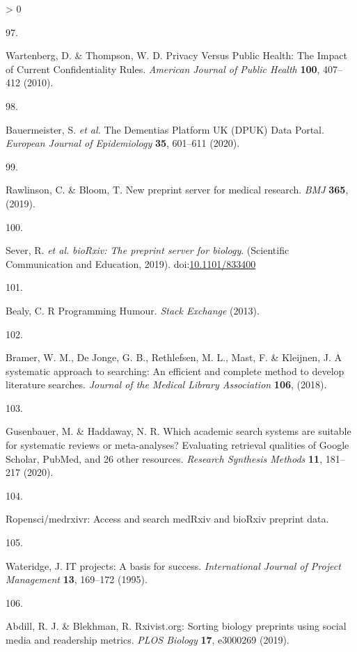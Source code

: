 \documentclass[a4paper, twoside]{templates/ociamthesis}
\newlength{\cslhangindent}
\newlength{\csllabelwidth}
\newenvironment{CSLReferences}[3] %
 {%
  \setlength{\parindent}{0pt}
  \ifodd #1 \everypar{\setlength{\hangindent}{\cslhangindent}}\ignorespaces\fi
  \ifnum #2 > 0
  \setlength{\parskip}{#2\baselineskip}
  \fi
 }%
 {}
\newcommand{\CSLLeftMargin}[1]{\parbox[t]{\maxof{\widthof{#1}}{\csllabelwidth}}{#1}}
\newcommand{\CSLRightInline}[1]{\parbox[t]{\linewidth - \csllabelwidth}{#1}}
\begin{document}
\begin{CSLReferences}{0}{0}
\leavevmode\hypertarget{ref-wartenberg2010}{}%
\CSLLeftMargin{97. }
\CSLRightInline{Wartenberg, D. \& Thompson, W. D. Privacy {Versus Public Health}: {The Impact} of {Current Confidentiality Rules}. \emph{American Journal of Public Health} \textbf{100}, 407--412 (2010).}

\leavevmode\hypertarget{ref-bauermeister2020}{}%
\CSLLeftMargin{98. }
\CSLRightInline{Bauermeister, S. \emph{et al.} The {Dementias Platform UK} ({DPUK}) {Data Portal}. \emph{European Journal of Epidemiology} \textbf{35}, 601--611 (2020).}

\leavevmode\hypertarget{ref-rawlinson2019}{}%
\CSLLeftMargin{99. }
\CSLRightInline{Rawlinson, C. \& Bloom, T. New preprint server for medical research. \emph{BMJ} \textbf{365}, (2019).}

\leavevmode\hypertarget{ref-sever2019}{}%
\CSLLeftMargin{100. }
\CSLRightInline{Sever, R. \emph{et al.} \emph{{bioRxiv}: The preprint server for biology}. ({Scientific Communication and Education}, 2019). doi:\href{https://doi.org/10.1101/833400}{10.1101/833400}}

\leavevmode\hypertarget{ref-bealy2013}{}%
\CSLLeftMargin{101. }
\CSLRightInline{Bealy, C. R {Programming Humour}. \emph{Stack Exchange} (2013).}

\leavevmode\hypertarget{ref-bramer2018a}{}%
\CSLLeftMargin{102. }
\CSLRightInline{Bramer, W. M., De Jonge, G. B., Rethlefsen, M. L., Mast, F. \& Kleijnen, J. A systematic approach to searching: An efficient and complete method to develop literature searches. \emph{Journal of the Medical Library Association} \textbf{106}, (2018).}

\leavevmode\hypertarget{ref-gusenbauer2020}{}%
\CSLLeftMargin{103. }
\CSLRightInline{Gusenbauer, M. \& Haddaway, N. R. Which academic search systems are suitable for systematic reviews or meta-analyses? {Evaluating} retrieval qualities of {Google Scholar}, {PubMed}, and 26 other resources. \emph{Research Synthesis Methods} \textbf{11}, 181--217 (2020).}

\leavevmode\hypertarget{ref-zotero-15029}{}%
\CSLLeftMargin{104. }
\CSLRightInline{Ropensci/medrxivr: {Access} and search {medRxiv} and {bioRxiv} preprint data.}

\leavevmode\hypertarget{ref-wateridge1995}{}%
\CSLLeftMargin{105. }
\CSLRightInline{Wateridge, J. {IT} projects: A basis for success. \emph{International Journal of Project Management} \textbf{13}, 169--172 (1995).}

\leavevmode\hypertarget{ref-abdill2019}{}%
\CSLLeftMargin{106. }
\CSLRightInline{Abdill, R. J. \& Blekhman, R. Rxivist.org: {Sorting} biology preprints using social media and readership metrics. \emph{PLOS Biology} \textbf{17}, e3000269 (2019).}


\end{CSLReferences}
\end{document}
